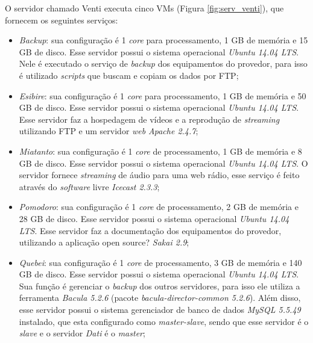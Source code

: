 O servidor chamado Venti executa cinco \ac{VM}s (Figura \ref{fig:serv_venti}), que fornecem os seguintes serviços:
\begin{itemize}
 \item \textit{Backup}: sua configuração é 1 \textit{core} para processamento, 1 GB de memória e 15 GB de disco. Esse servidor possui o 
 sistema operacional \textit{Ubuntu 14.04 \ac{LTS}}. Nele é executado o serviço de \textit{backup} dos equipamentos do provedor, para isso 
 é utilizado \textit{scripts} que buscam e copiam os dados por \ac{FTP};
 
 \item \textit{Esibire}: sua configuração é 1 \textit{core} para processamento, 1 GB de memória e 50 GB de disco. Esse servidor possui o 
 sistema operacional \textit{Ubuntu 14.04 \ac{LTS}}. Esse servidor faz a hospedagem de vídeos e a reprodução de \textit{streaming} utilizando
 \ac{FTP} e um servidor \textit{web} \textit{Apache 2.4.7};
 
 \item \textit{Miatanto}: sua configuração é 1 \textit{core} de processamento, 1 GB de memória e 8 GB de disco. Esse servidor possui o 
 sistema operacional \textit{Ubuntu 14.04 \ac{LTS}}. O servidor fornece \textit{streaming} de áudio para uma web rádio, esse serviço é feito
 através do \textit{software} livre \textit{Icecast 2.3.3};
 
 \item \textit{Pomodoro}: sua configuração é 1 \textit{core} de processamento, 2 GB de memória e 28 GB de disco. Esse servidor possui o 
 sistema operacional \textit{Ubuntu 14.04 \ac{LTS}}. Esse servidor faz a documentação dos equipamentos do provedor, utilizando a aplicação
 open source? \textit{Sakai 2.9};
 
 \item \textit{Quebei}: sua configuração é 1 \textit{core} de processamento, 3 GB de memória e 140 GB de disco. Esse servidor possui o 
 sistema operacional \textit{Ubuntu 14.04 \ac{LTS}}. Sua função é gerenciar o \textit{backup} dos outros servidores, para isso ele utiliza a 
 ferramenta \textit{Bacula 5.2.6} (pacote \textit{bacula-director-common 5.2.6}). Além disso, esse servidor possui o sistema gerenciador de banco de dados 
 \textit{MySQL 5.5.49} instalado, que esta configurado como \textit{master-slave}, sendo que esse servidor é o \textit{slave} e o servidor 
 \textit{Dati} é o \textit{master};
\end{itemize}

